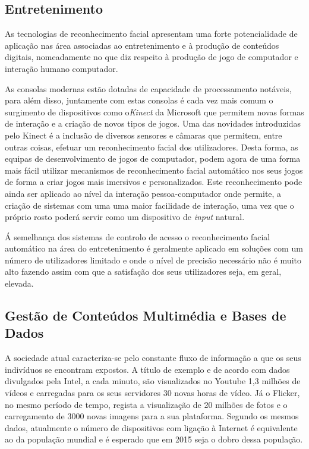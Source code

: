 \subsection{Entretenimento} \label{Entretenimento}
As tecnologias de reconhecimento facial apresentam uma forte potencialidade de aplicação nas área associadas ao entretenimento e à produção de conteúdos digitais, nomeadamente no que diz respeito à produção de jogo de computador e interação humano computador.

As consolas modernas estão dotadas de capacidade de processamento notáveis, para além disso, juntamente com estas consolas é cada vez mais comum o surgimento de dispositivos como o\textit{Kinect} da Microsoft que permitem novas formas de interação e a criação de novos tipos de jogos. Uma das novidades introduzidas pelo Kinect é a inclusão de diversos sensores e câmaras que permitem, entre outras coisas, efetuar um reconhecimento facial dos utilizadores. Desta forma, as equipas de desenvolvimento de jogos de computador, podem agora de uma forma mais fácil utilizar mecanismos de reconhecimento facial automático nos seus jogos de forma a criar jogos mais imersivos e personalizados. Este reconhecimento pode ainda ser aplicado ao nível da interação pessoa-computador  onde permite, a criação de sistemas com uma  uma maior facilidade de interação, uma vez que o próprio rosto poderá servir como um dispositivo de \textit{input} natural. 

Á semelhança dos sistemas de controlo de acesso o reconhecimento facial automático na área do entretenimento é geralmente aplicado em soluções com um número de utilizadores limitado e onde o nível de precisão necessário não é muito alto fazendo assim com que a satisfação dos seus utilizadores seja, em geral, elevada.

\subsection{Gestão de Conteúdos Multimédia e Bases de Dados} \label{GestaoMultimedia}
A sociedade atual caracteriza-se pelo constante fluxo de informação a que os seus indivíduos se encontram expostos. A título de exemplo e de acordo com dados divulgados pela Intel\citep{IntelCorporation}, a cada minuto, são visualizados no Youtube 1,3 milhões de vídeos e carregadas para os seus servidores 30 novas horas de vídeo. Já o Flicker, no mesmo período de tempo, regista a visualização de 20 milhões de fotos e o carregamento de 3000 novas imagens para a sua plataforma. Segundo os mesmos dados, atualmente o número de dispositivos com ligação à Internet é equivalente ao da população mundial e é esperado que em 2015 seja o dobro dessa população.

